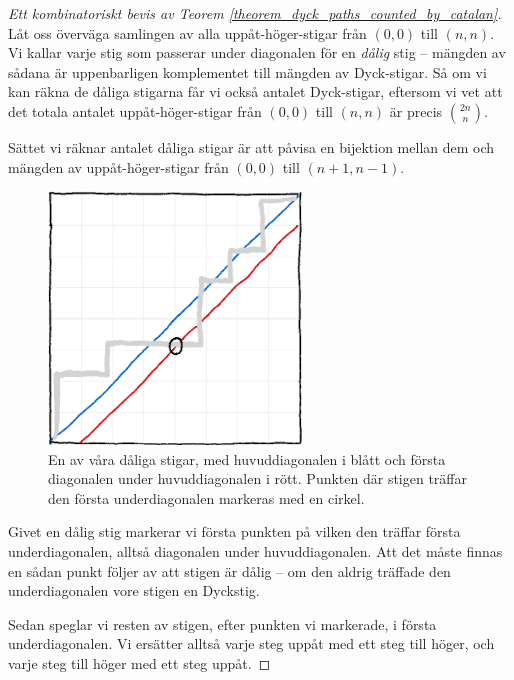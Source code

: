 \documentclass[nobib]{tufte-handout}
\begin{document}
\begin{proof}[Ett kombinatoriskt bevis av Teorem \ref{theorem_dyck_paths_counted_by_catalan}]
    Låt oss överväga samlingen av alla uppåt-höger-stigar från $(0,0)$ till $(n,n)$. Vi kallar varje stig som passerar under diagonalen för en \emph{dålig} stig -- mängden av sådana är uppenbarligen komplementet till mängden av Dyck-stigar. Så om vi kan räkna de dåliga stigarna får vi också antalet Dyck-stigar, eftersom vi vet att det totala antalet uppåt-höger-stigar från $(0,0)$ till $(n,n)$ är precis $\binom{2n}{n}$.

    Sättet vi räknar antalet dåliga stigar är att påvisa en bijektion mellan dem och mängden av uppåt-höger-stigar från $(0,0)$ till $(n+1,n-1)$.

    \begin{figure}\label{fig:dyck_comb_proof_path}
        \centering
        \includegraphics[width=0.6\textwidth]{graphics/dyck_combinatorial_proof_path.png}
        \caption{En av våra dåliga stigar, med huvuddiagonalen i blått och första diagonalen under huvuddiagonalen i rött. Punkten där stigen träffar den första underdiagonalen markeras med en cirkel.}
    \end{figure}

    Givet en dålig stig markerar vi första punkten på vilken den träffar första underdiagonalen, alltså diagonalen under huvuddiagonalen. Att det måste finnas en sådan punkt följer av att stigen är dålig -- om den aldrig träffade den underdiagonalen vore stigen en Dyckstig.

    Sedan speglar vi resten av stigen, efter punkten vi markerade, i första underdiagonalen. Vi ersätter alltså varje steg uppåt med ett steg till höger, och varje steg till höger med ett steg uppåt. 


\end{proof}
\end{document}
